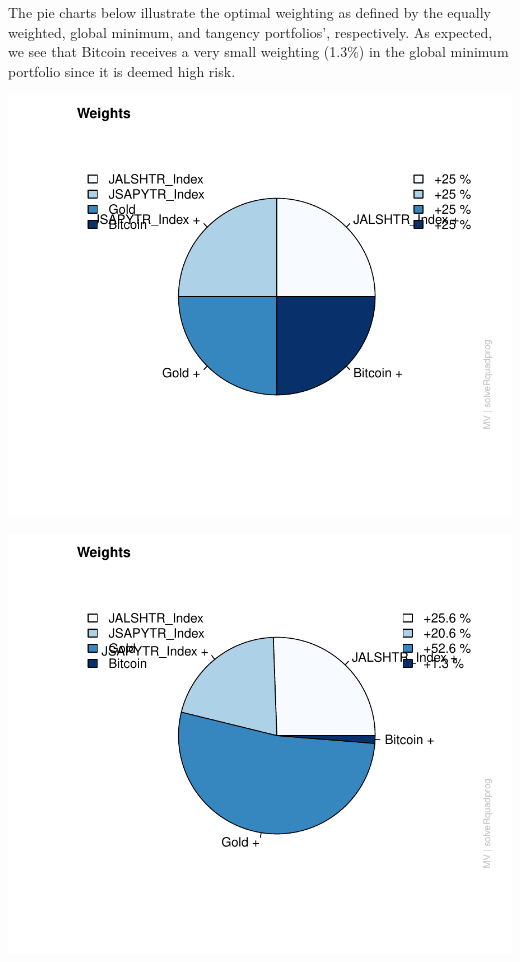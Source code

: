 \documentclass[11pt,preprint, authoryear]{elsarticle}
\numberwithin{equation}{section}
\numberwithin{figure}{section}
\numberwithin{table}{section}
\begin{document}
The pie charts below illustrate the optimal weighting as defined by the
equally weighted, global minimum, and tangency portfolios',
respectively. As expected, we see that Bitcoin receives a very small
weighting (1.3\%) in the global minimum portfolio since it is deemed
high risk.

\includegraphics{FinMetrics-Essay_files/figure-latex/unnamed-chunk-20-1.pdf}

\includegraphics{FinMetrics-Essay_files/figure-latex/unnamed-chunk-21-1.pdf}
\end{document}
